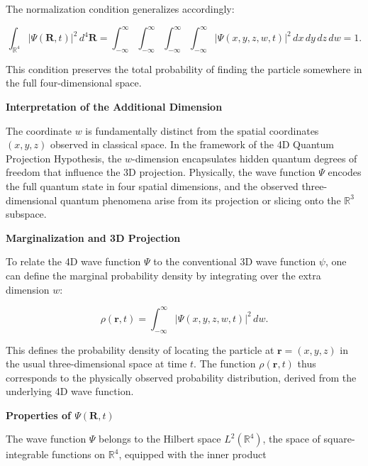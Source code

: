 \documentclass[12pt]{article}
\begin{document}
The normalization condition generalizes accordingly:

\begin{equation}
\int_{\mathbb{R}^4} |\Psi(\mathbf{R}, t)|^2 \, d^4 \mathbf{R} = \int_{-\infty}^{\infty} \int_{-\infty}^{\infty} \int_{-\infty}^{\infty} \int_{-\infty}^{\infty} |\Psi(x, y, z, w, t)|^2 \, dx \, dy \, dz \, dw = 1.
\label{eq:normalization}
\end{equation}

This condition preserves the total probability of finding the particle somewhere in the full four-dimensional space.

\medskip

\textbf{Interpretation of the Additional Dimension}

The coordinate \(w\) is fundamentally distinct from the spatial coordinates \((x,y,z)\) observed in classical space. In the framework of the 4D Quantum Projection Hypothesis, the \(w\)-dimension encapsulates hidden quantum degrees of freedom that influence the 3D projection. Physically, the wave function \(\Psi\) encodes the full quantum state in four spatial dimensions, and the observed three-dimensional quantum phenomena arise from its projection or slicing onto the \(\mathbb{R}^3\) subspace.

\medskip

\textbf{Marginalization and 3D Projection}

To relate the 4D wave function \(\Psi\) to the conventional 3D wave function \(\psi\), one can define the marginal probability density by integrating over the extra dimension \(w\):

\begin{equation}
\rho(\mathbf{r}, t) = \int_{-\infty}^{\infty} |\Psi(x, y, z, w, t)|^2 \, dw.
\label{eq:marginal_density}
\end{equation}

This defines the probability density of locating the particle at \(\mathbf{r} = (x,y,z)\) in the usual three-dimensional space at time \(t\). The function \(\rho(\mathbf{r}, t)\) thus corresponds to the physically observed probability distribution, derived from the underlying 4D wave function.

\medskip

\textbf{Properties of \(\Psi(\mathbf{R}, t)\)}

The wave function \(\Psi\) belongs to the Hilbert space \(L^2(\mathbb{R}^4)\), the space of square-integrable functions on \(\mathbb{R}^4\), equipped with the inner product
\end{document}
